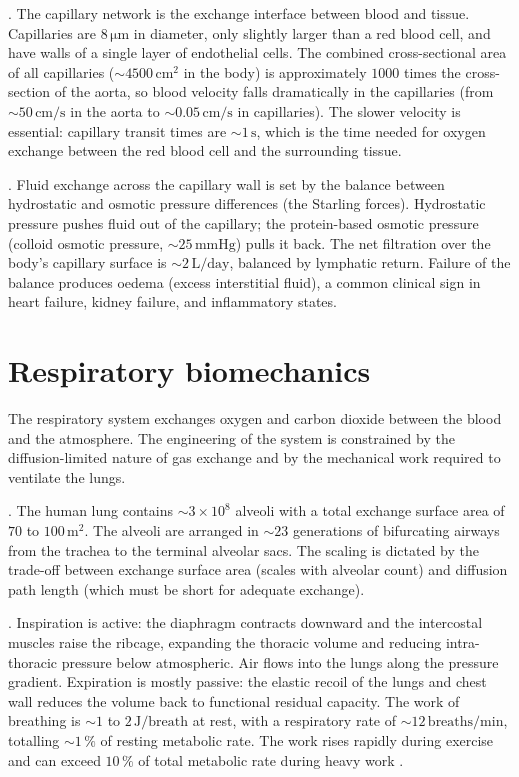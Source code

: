 . The capillary network is the
exchange interface between blood and tissue. Capillaries are
$8\,\si{\micro\meter}$ in diameter, only slightly larger than a red
blood cell, and have walls of a single layer of endothelial cells.
The combined cross-sectional area of all capillaries
($\sim 4500\,\text{cm}^2$ in the body) is approximately $1000$ times
the cross-section of the aorta, so blood velocity falls dramatically
in the capillaries (from $\sim 50\,\text{cm}/\text{s}$ in the aorta
to $\sim 0.05\,\text{cm}/\text{s}$ in capillaries). The slower
velocity is essential: capillary transit times are $\sim 1\,\text{s}$,
which is the time needed for oxygen exchange between the red blood
cell and the surrounding tissue.

. Fluid exchange across the capillary wall
is set by the balance between hydrostatic and osmotic pressure
differences (the Starling forces). Hydrostatic pressure pushes fluid
out of the capillary; the protein-based osmotic pressure (colloid
osmotic pressure, $\sim 25\,\text{mmHg}$) pulls it back. The
net filtration over the body's capillary surface is
$\sim 2\,\text{L}/\text{day}$, balanced by lymphatic return. Failure
of the balance produces oedema (excess interstitial fluid), a
common clinical sign in heart failure, kidney failure, and
inflammatory states.

\section{Respiratory biomechanics}

The respiratory system exchanges oxygen and carbon dioxide between
the blood and the atmosphere. The engineering of the system is
constrained by the diffusion-limited nature of gas exchange and by
the mechanical work required to ventilate the lungs.

. The human lung contains
$\sim 3 \times 10^8$ alveoli with a total exchange surface area of
$70$ to $100\,\text{m}^2$. The alveoli are arranged in
$\sim 23$ generations of bifurcating airways from the trachea to
the terminal alveolar sacs. The scaling is dictated by the trade-off
between exchange surface area (scales with alveolar count) and
diffusion path length (which must be short for adequate exchange).

. Inspiration is active: the
diaphragm contracts downward and the intercostal muscles raise the
ribcage, expanding the thoracic volume and reducing intra-thoracic
pressure below atmospheric. Air flows into the lungs along the
pressure gradient. Expiration is mostly passive: the elastic recoil
of the lungs and chest wall reduces the volume back to functional
residual capacity. The work of breathing is $\sim 1$ to $2\,\text{J}/
\text{breath}$ at rest, with a respiratory rate of $\sim 12\,
\text{breaths}/\text{min}$, totalling $\sim 1\,\%$ of resting
metabolic rate. The work rises rapidly during exercise and can
exceed $10\,\%$ of total metabolic rate during heavy work
\cite[ch.~7]{text:v6c06-west-respiratory-2012}.

